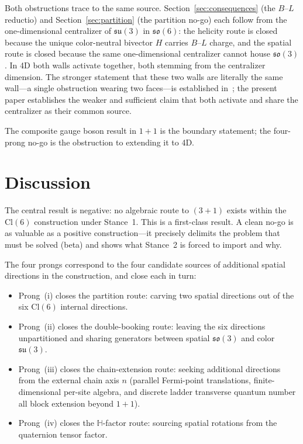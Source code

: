 \documentclass[aip,jmp,amsmath,amssymb,reprint,author-year]{revtex4-2}
\begin{document}
Both obstructions trace to the same source.  Section~\ref{sec:consequences}
(the $B$--$L$ reductio) and Section~\ref{sec:partition} (the partition
no-go) each follow from the one-dimensional centralizer of
$\mathfrak{su}(3)$ in $\mathfrak{so}(6)$: the helicity route is closed
because the unique color-neutral bivector $H$ carries $B$--$L$ charge,
and the spatial route is closed because the same one-dimensional
centralizer cannot house $\mathfrak{so}(3)$.  In 4D both walls activate
together, both stemming from the centralizer dimension.  The stronger
statement that these two walls are literally the same wall---a single
obstruction wearing two faces---is established
in~\citep{TwoWalls}; the present paper establishes the weaker
and sufficient claim that both activate and share the centralizer as
their common source.

The composite gauge boson result in $1{+}1$ is the boundary statement;
the four-prong no-go is the obstruction to extending it to 4D.

\section{Discussion}
\label{sec:discussion}

The central result is negative: no algebraic route to $(3{+}1)$ exists
within the $\mathrm{Cl}(6)$ construction under Stance~1.  This is a
first-class result.  A clean no-go is as valuable as a positive
construction---it precisely delimits the problem that must be solved
(beta) and shows what Stance~2 is forced to import and why.

The four prongs correspond to the four candidate sources of additional
spatial directions in the construction, and close each in turn:

\begin{itemize}
\item Prong~(i) closes the partition route: carving two spatial
  directions out of the six $\mathrm{Cl}(6)$ internal directions.
\item Prong~(ii) closes the double-booking route: leaving the six
  directions unpartitioned and sharing generators between spatial
  $\mathfrak{so}(3)$ and color $\mathfrak{su}(3)$.
\item Prong~(iii) closes the chain-extension route: seeking additional
  directions from the external chain axis $n$ (parallel Fermi-point
  translations, finite-dimensional per-site algebra, and discrete ladder
  transverse quantum number all block extension beyond $1{+}1$).
\item Prong~(iv) closes the $\mathbb{H}$-factor route: sourcing spatial
  rotations from the quaternion tensor factor.
\end{itemize}
\end{document}
